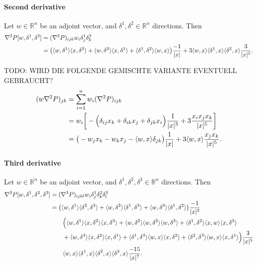 \documentclass[a4paper]{article}
\newcommand{\R}{\mathbb R}
\DeclarePairedDelimiter{\abs}{\lvert}{\rvert}
\begin{document}
\paragraph{Second derivative}

Let $w \in \R^n$ be an adjoint vector, and $\delta^1, \delta^2 \in \R^n$ directions.
Then
\begin{align*}
 \nabla^2P[w,\delta^1,\delta^2]
 & =
 (\nabla^2 P)_{ijk} w_i \delta^1_j \delta^2_k
 \\
 & =
 \big(\langle w, \delta^1 \rangle \langle x,\delta^2 \rangle
    + \langle w, \delta^2 \rangle \langle x,\delta^1 \rangle
    + \langle \delta^1, \delta^2\rangle \langle w,x \rangle \big)\frac{-1}{\abs{x}}
 + 3\langle w,x \rangle \langle \delta^1,x \rangle \langle \delta^2,x \rangle \frac{3}{\abs{x}^5}.
\end{align*}


TODO: WIRD DIE FOLGENDE GEMISCHTE VARIANTE EVENTUELL GEBRAUCHT?
\begin{align*}
 (w \nabla^2 P)_{jk}
 & =
 \sum_{i=1}^n w_i (\nabla^2 P)_{ijk}
 \\
 & =
 w_i\bigg[- \Big( \delta_{ij}x_k + \delta_{ik}x_j + \delta_{jk}x_i\Big) \frac{1}{\abs{x}^3}
 + 3 \frac{x_i x_j x_k}{\abs{x}^5} \bigg]
 \\
 & =
 \big( - w_j x_k - w_kx_j - \langle w,x\rangle \delta_{jk}\big)\frac{1}{\abs{x}}
 + 3\langle w,x \rangle \frac{x_j x_k}{\abs{x}^5}.
\end{align*}

\paragraph{Third derivative}

Let $w \in \R^n$ be an adjoint vector, and $\delta^1, \delta^2, \delta^3 \in \R^n$ directions.
Then
\begin{align*}
 \nabla^3P[w,\delta^1,\delta^2,\delta^3]
 & =
 (\nabla^3 P)_{ijkl} w_i \delta^1_j \delta^2_k \delta^3_l
 \\
 & =
 \big(\langle w, \delta^1 \rangle \langle \delta^2,\delta^3 \rangle
    + \langle w, \delta^2 \rangle \langle \delta^1,\delta^3 \rangle
    + \langle w, \delta^3 \rangle \langle \delta^1,\delta^2 \rangle \big)
    \frac{-1}{\abs{x}^3}
 \\
 & \qquad
 \Big( \langle w,\delta^1 \rangle \langle x, \delta^2 \rangle \langle x, \delta^3 \rangle
  + \langle w,\delta^2 \rangle \langle w, \delta^2 \rangle \langle w, \delta^3 \rangle
  + \langle \delta^1,\delta^2 \rangle \langle x, w \rangle \langle x, \delta^3 \rangle
  \\
 & \qquad
  + \langle w,\delta^3 \rangle \langle x, \delta^2 \rangle \langle x, \delta^1 \rangle
  + \langle \delta^1,\delta^3 \rangle \langle w, x \rangle \langle x, \delta^2 \rangle
  + \langle \delta^2,\delta^3 \rangle \langle w, x \rangle \langle x, \delta^1 \rangle \Big)
 \frac{3}{\abs{x}^5}
 \\
  & \qquad
 \langle w,x \rangle \langle \delta^1,x \rangle \langle \delta^2,x \rangle \langle \delta^3,x \rangle
 \frac{-15}{\abs{x}^7}.
\end{align*}
\end{document}
